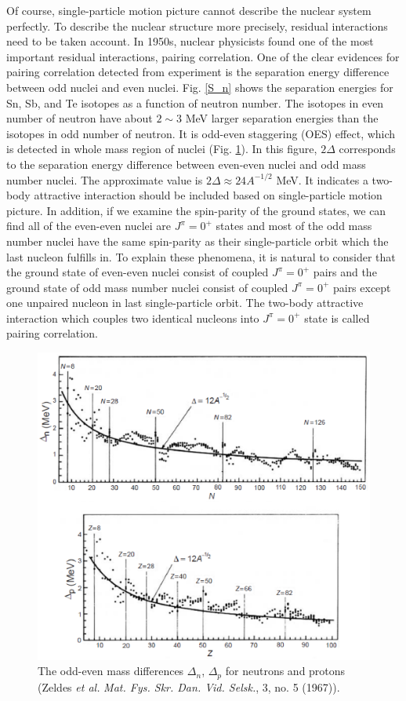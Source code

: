 \documentclass[11pt]{book} %
\begin{document}
Of course, single-particle motion picture cannot describe the nuclear system perfectly. To describe the nuclear structure more precisely, residual interactions need to be taken account. In 1950s, nuclear physicists found one of the most important residual interactions, pairing correlation. One of the clear evidences for pairing correlation detected from experiment is the separation energy difference between odd nuclei and even nuclei. Fig. \ref{S_n} shows the separation energies for Sn, Sb, and Te isotopes as a function of neutron number. The isotopes in even number of neutron have about $2\sim3$ MeV larger separation energies than the isotopes in odd number of neutron.
It is odd-even staggering (OES) effect, which is detected in whole mass region of nuclei (Fig. \ref{gap}). In this figure, $2\Delta$ corresponds to the separation energy difference between even-even nuclei and odd mass number nuclei. The approximate value is $2\Delta \approx 24A^{-1/2}$ MeV. It indicates a two-body attractive interaction should be included based on single-particle motion picture. In addition, if we examine the spin-parity of the ground states, we can find all of the even-even nuclei are $J^{\pi}=0^+$ states and most of the odd mass number nuclei have the same spin-parity as their single-particle orbit which the last nucleon fulfills in.
To explain these phenomena, it is natural to consider that the ground state of even-even nuclei consist of coupled $J^{\pi}=0^+$ pairs and the ground state of odd mass number nuclei consist of coupled $J^{\pi}=0^+$ pairs except one unpaired nucleon in last single-particle orbit. The two-body attractive interaction which couples two identical nucleons into $J^{\pi}=0^+$ state is called pairing correlation.

\begin{figure}[tb]
 \begin{center}
    \includegraphics[width=120mm]{images/gap.eps}
 \end{center}
  \caption{The odd-even mass differences $\Delta_n$, $\Delta_p$ for neutrons and protons (Zeldes {\it et al.} {\it Mat. Fys. Skr. Dan. Vid. Selsk.}, 3, no. 5 (1967)).}
  \label{gap}
\end{figure}
\end{document}
